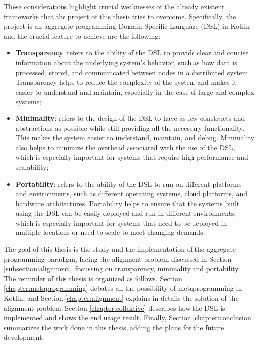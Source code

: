 These considerations highlight crucial weaknesses of the already existent frameworks that the project of this thesis tries to overcome. Specifically, the project is an aggregate programming Domain-Specific Language (DSL) in Kotlin and the crucial feature to achieve are the following:
\begin{itemize}
    \item \textbf{Transparency}: refers to the ability of the DSL to provide clear and concise information about the underlying system's behavior, such as how data is processed, stored, and communicated between nodes in a distributed system. Transparency helps to reduce the complexity of the system and makes it easier to understand and maintain, especially in the case of large and complex systems;
    \item \textbf{Minimality}: refers to the design of the DSL to have as few constructs and abstractions as possible while still providing all the necessary functionality. This makes the system easier to understand, maintain, and debug. Minimality also helps to minimize the overhead associated with the use of the DSL, which is especially important for systems that require high performance and scalability;
    \item \textbf{Portability}: refers to the ability of the DSL to run on different platforms and environments, such as different operating systems, cloud platforms, and hardware architectures. Portability helps to ensure that the systems built using the DSL can be easily deployed and run in different environments, which is especially important for systems that need to be deployed in multiple locations or need to scale to meet changing demands.
\end{itemize}

The goal of this thesis is the study and the implementation of the aggregate programming paradigm, facing the alignment problem discussed in Section \ref{subsection:alignment}, focussing on transparency, minimality and portability.\newline
The reminder of this thesis is organized as follows. Section \ref{chapter:metaprogramming} debates all the possibility of metaprogramming in Kotlin, and Section \ref{chapter:alignment} explains in details the solution of the alignment problem. Section \ref{chapter:collektive} describes how the DSL is implemented and shows the end usage result. Finally, Section \ref{chapter:conclusion} summarizes the work done in this thesis, adding the plans for the future development.
